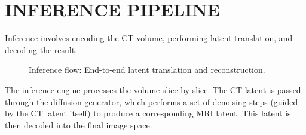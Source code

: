 \documentclass[10pt,a4paper]{article}
\begin{document}
\section{INFERENCE PIPELINE}
Inference involves encoding the CT volume, performing latent translation, and decoding the result.

\begin{figure}[H]
\centering
{}
\caption{Inference flow: End-to-end latent translation and reconstruction.}
\end{figure}

The inference engine processes the volume slice-by-slice. The CT latent is passed through the diffusion generator, which performs a set of denoising steps (guided by the CT latent itself) to produce a corresponding MRI latent. This latent is then decoded into the final image space.
\end{document}
